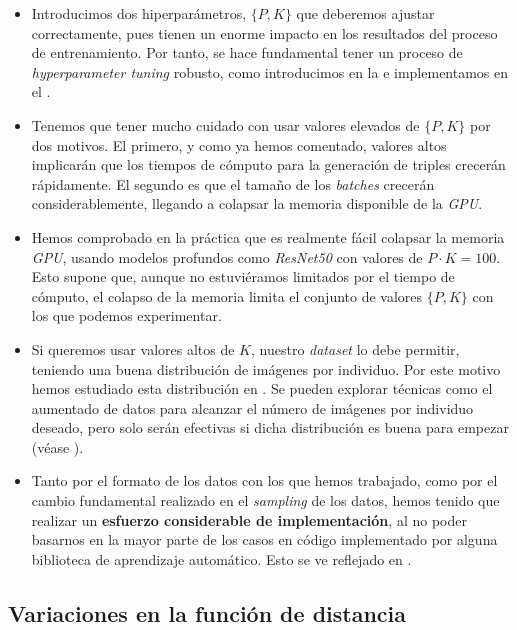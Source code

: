 \begin{itemize}
    \item Introducimos dos hiperparámetros, $\{P, K\}$ que deberemos ajustar correctamente, pues tienen un enorme impacto en los resultados del proceso de entrenamiento. Por tanto, se hace fundamental tener un proceso de \textit{hyperparameter tuning} robusto, como introducimos en la  e implementamos en el .
    \item Tenemos que tener mucho cuidado con usar valores elevados de $\{P, K\}$ por dos motivos. El primero, y como ya hemos comentado, valores altos implicarán que los tiempos de cómputo para la generación de triples crecerán rápidamente. El segundo es que el tamaño de los \textit{batches} crecerán considerablemente, llegando a colapsar la memoria disponible de la \textit{GPU}.
    \item Hemos comprobado en la práctica que es realmente fácil colapsar la memoria \textit{GPU}, usando modelos profundos como \textit{ResNet50} con valores de $P \cdot K = 100$. Esto supone que, aunque no estuviéramos limitados por el tiempo de cómputo, el colapso de la memoria limita el conjunto de valores $\{P, K\}$ con los que podemos experimentar.
    \item Si queremos usar valores altos de $K$, nuestro \textit{dataset} lo debe permitir, teniendo una buena distribución de imágenes por individuo. Por este motivo hemos estudiado esta distribución en . Se pueden explorar técnicas como el aumentado de datos para alcanzar el número de imágenes por individuo deseado, pero solo serán efectivas si dicha distribución es buena para empezar (véase ).
    \item Tanto por el formato de los datos con los que hemos trabajado, como por el cambio fundamental realizado en el \textit{sampling} de los datos, hemos tenido que realizar un \textbf{esfuerzo considerable de implementación}, al no poder basarnos en la mayor parte de los casos en código implementado por alguna biblioteca de aprendizaje automático. Esto se ve reflejado en .
\end{itemize}

\subsection{Variaciones en la función de distancia}

